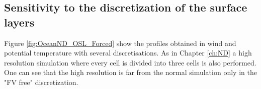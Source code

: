 \subsection{Sensitivity to the discretization
	of the surface layers}
\label{sec:ND_Ocean_bulkRadiativeFluxes}
Figure \ref{fig:OceanND_OSL_Forced}
show the profiles obtained in wind and
potential temperature with several discretisations.
As in Chapter \ref{ch:ND} a high resolution simulation
where every cell is divided into three cells
is also performed.
One can see that the high resolution
is far from the normal simulation only in the "FV free"
discretization.

